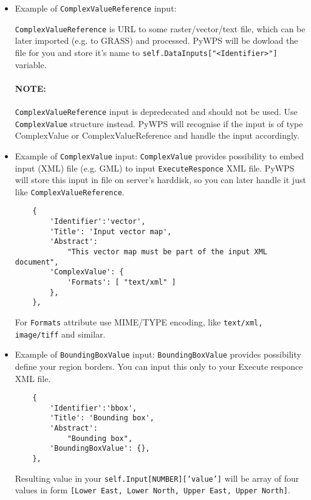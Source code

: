 \documentclass[a4paper,11pt]{article}
\begin{document}
\begin{itemize}
\begin{verbatim}
    \end{verbatim}
         

        \item Example of \texttt{ComplexValueReference} input:

        \texttt{ComplexValueReference} is URL to some raster/vector/text
        file, which can be later imported (e.g. to GRASS) and processed.
        PyWPS will be dowload the file for you and store it's name to
        \texttt{self.DataInputs["<Identifier>"]} variable.

        \paragraph{NOTE:} \texttt{ComplexValueReference} input is depredecated and
        should not be used. Use \texttt{ComplexValue} structure instead.
        PyWPS will recognise if the input is of type ComplexValue or
        ComplexValueReference and handle the input accordingly.
     

        \item Example of \texttt{ComplexValue} input:
        \texttt{ComplexValue} provides possibility to embed input (XML)
        file (e.g. GML) to input \texttt{ExecuteResponce} XML file. PyWPS
        will store this input in file on server's harddisk, so you can
        later handle it just like \texttt{ComplexValueReference}.

    \begin{verbatim}
    {
        'Identifier':'vector',
        'Title': 'Input vector map',
        'Abstract':
            "This vector map must be part of the input XML document",
        'ComplexValue': {
            'Formats': [ "text/xml" ]
        },
    },
    \end{verbatim}

    For \texttt{Formats} attribute use MIME/TYPE encoding, like
    \texttt{text/xml, image/tiff} and similar.

        \item Example of \texttt{BoundingBoxValue} input:
        \texttt{BoundingBoxValue} provides possibility define your region
        borders. You can input this only to your Execute responce XML file.

    \begin{verbatim}
    {
        'Identifier':'bbox',
        'Title': 'Bounding box',
        'Abstract':
            "Bounding box",
        'BoundingBoxValue': {},
    },
    \end{verbatim}

    Resulting value in your \texttt{self.Input[NUMBER]['value']} will be
    array of four values in form \texttt{[Lower East, Lower North, Upper
    East, Upper North]}.
         
    \end{itemize}
\end{document}
